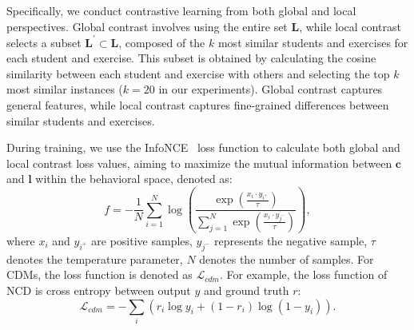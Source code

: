 Specifically, we conduct contrastive learning from both global and local perspectives. 
Global contrast involves using the entire set $\mathbf{L}$, while local contrast selects a subset $\mathbf{L}^\prime \subset \mathbf{L}$, composed of the $k$ most similar students and exercises for each student and exercise. This subset is obtained by calculating the cosine similarity between each student and exercise with others and selecting the top $k$ most similar instances ($k=20$ in our experiments).
Global contrast captures general features, while local contrast captures fine-grained differences between similar students and exercises.

During training, we use the InfoNCE~\cite{oord2018representation} loss function to calculate both global and local contrast loss values, aiming to maximize the mutual information between $\mathbf{c}$ and $\mathbf{l}$ within the behavioral space, denoted as:
\begin{equation}
    f=-\frac{1}{N} \sum_{i=1}^{N} \log \left(\frac{\exp \left(\frac{x_{i} \cdot y_{i^+}}{\tau}\right)}{\sum_{j=1}^{N} \exp \left(\frac{x_{i} \cdot y_{j^{-}}}{\tau}\right)}\right),
\end{equation}
where $x_{i}$ and $y_{i^+}$ are positive samples, $y_{j^{-}}$ represents the negative sample, $\tau$ denotes the temperature parameter, $N$ denotes the number of samples.
For CDMs, the loss function is denoted as $\mathcal{L}_{cdm}$. For example, the loss function of NCD is cross entropy between output $y$ and ground truth $r$:
\begin{equation}
    \mathcal{L}_{cdm}=-\sum_{i}\left(r_{i} \log y_{i}+\left(1-r_{i}\right) \log \left(1-y_{i}\right)\right).
\end{equation}

